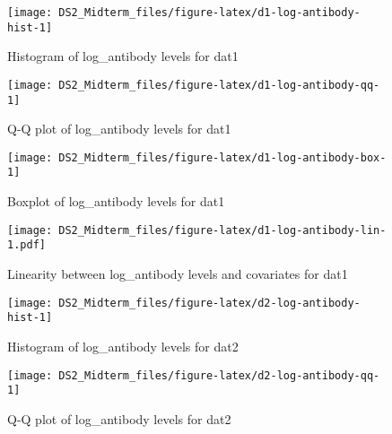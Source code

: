 \documentclass[
]{article}
\begin{document}
\begin{figure}

{\centering \texttt{[image: DS2\_Midterm\_files/figure-latex/d1-log-antibody-hist-1]} 

}

\caption{Histogram of log\_antibody levels for dat1}\label{fig:d1-log-antibody-hist}
\end{figure}

\begin{figure}

{\centering \texttt{[image: DS2\_Midterm\_files/figure-latex/d1-log-antibody-qq-1]} 

}

\caption{Q-Q plot of log\_antibody levels for dat1}\label{fig:d1-log-antibody-qq}
\end{figure}

\begin{figure}

{\centering \texttt{[image: DS2\_Midterm\_files/figure-latex/d1-log-antibody-box-1]} 

}

\caption{Boxplot of log\_antibody levels for dat1}\label{fig:d1-log-antibody-box}
\end{figure}

\begin{figure}
\centering
\texttt{[image: DS2\_Midterm\_files/figure-latex/d1-log-antibody-lin-1.pdf]}
\caption{\label{fig:d1-log-antibody-lin}Linearity between log\_antibody levels and covariates for dat1}
\end{figure}

\begin{figure}

{\centering \texttt{[image: DS2\_Midterm\_files/figure-latex/d2-log-antibody-hist-1]} 

}

\caption{Histogram of log\_antibody levels for dat2}\label{fig:d2-log-antibody-hist}
\end{figure}

\begin{figure}

{\centering \texttt{[image: DS2\_Midterm\_files/figure-latex/d2-log-antibody-qq-1]} 

}

\caption{Q-Q plot of log\_antibody levels for dat2}\label{fig:d2-log-antibody-qq}
\end{figure}
\end{document}
